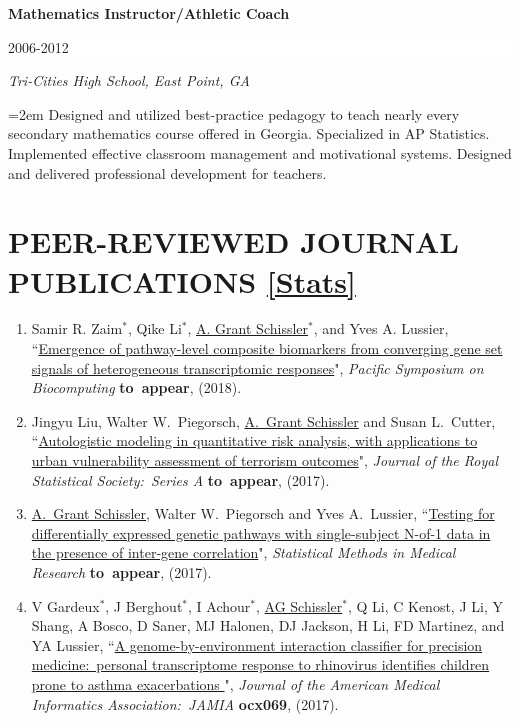 \documentclass[paper=a4,fontsize=11pt]{scrartcl} %
\newcommand{\NewPart}[2]{\section*{\uppercase{#1} #2 }}
\newcommand{\EducationEntry}[4]{
		\noindent \textbf{#1} \hfill      %
		\colorbox{White}{%
			\parbox{6em}{%
			\hfill\color{Black}#2}} \par  %
		\noindent \textit{#3} \par        %
		\noindent\hangindent=2em\hangafter=0 \small #4 %
		\normalsize \par \vspace{-7pt}}
\newcommand{\PaperEntry}[7]{
		\noindent #1, ``\href{#7}{#2}", \textit{#3} \textbf{#4}, #5 (#6).}
\begin{document}
\clearpage
\EducationEntry{Mathematics Instructor/Athletic Coach}{2006-2012}{Tri-Cities High School, East Point, GA}
{Designed and utilized best-practice pedagogy to teach nearly every secondary mathematics course offered in Georgia.  Specialized in AP Statistics. Implemented effective classroom management and motivational systems. Designed and delivered professional development for teachers.}


\NewPart{Peer-Reviewed Journal Publications}{\href{https://scholar.google.com/citations?user=1H-SHoMAAAAJ&hl=en}{[Stats]}}
\vspace{-7pt}
\begin{enumerate}

\item \PaperEntry{Samir R. Zaim$^{*}$, Qike Li$^{*}$, \underline{A. Grant Schissler}$^{*}$, and Yves A. Lussier}{Emergence of pathway-level composite biomarkers from converging gene set signals of heterogeneous transcriptomic responses}{Pacific Symposium on Biocomputing} {to~appear}{}{2018}{}
  
\item \PaperEntry{Jingyu Liu, Walter W.~Piegorsch, \underline{A.~Grant Schissler} and Susan L.~Cutter}{Autologistic modeling in quantitative risk analysis, with applications to urban vulnerability assessment of terrorism outcomes}{Journal of the Royal Statistical Society:~Series A}{to~appear}{}{2017}{}
  
  \item \PaperEntry{\underline{A.~Grant Schissler}, Walter W.~Piegorsch and Yves A.~Lussier}{Testing for differentially expressed genetic pathways with single-subject N-of-1 data in the presence of inter-gene correlation}{Statistical Methods in Medical Research}{to~appear}{}{2017}{}

  \item \PaperEntry{V Gardeux$^{*}$, J Berghout$^{*}$, I Achour$^{*}$, \underline{AG Schissler}$^{*}$, Q Li, C Kenost, J Li, Y Shang, A Bosco, D Saner, MJ Halonen, DJ Jackson, H Li, FD Martinez, and YA Lussier}{A genome-by-environment interaction classifier for precision medicine:~personal transcriptome response to rhinovirus identifies children prone to asthma exacerbations
}{Journal of the American Medical Informatics Association:~JAMIA}{ocx069}{}{2017}{https://academic.oup.com/jamia/article-abstract/doi/10.1093/jamia/ocx069/4004728/A-genome-by-environment-interaction-classifier-for?redirectedFrom=fulltext}


\end{enumerate}
\end{document}
